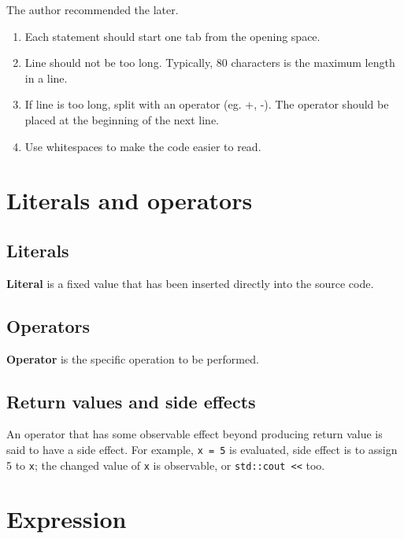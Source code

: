 \documentclass[
  letterpaper,
  DIV=11,
  numbers=noendperiod]{scrreprt}
\providecommand{\tightlist}{%
  \setlength{\itemsep}{0pt}\setlength{\parskip}{0pt}}\usepackage{longtable,booktabs,array}
\begin{document}
The author recommended the later.

\begin{enumerate}
\def\labelenumi{\arabic{enumi}.}
\setcounter{enumi}{2}
\tightlist
\item
  Each statement should start one tab from the opening space.
\item
  Line should not be too long. Typically, 80 characters is the maximum
  length in a line.
\item
  If line is too long, split with an operator (eg. +, -). The operator
  should be placed at the beginning of the next line.
\item
  Use whitespaces to make the code easier to read.
\end{enumerate}

\hypertarget{literals-and-operators}{%
\section{Literals and operators}\label{literals-and-operators}}

\hypertarget{literals}{%
\subsection{Literals}\label{literals}}

\textbf{Literal} is a fixed value that has been inserted directly into
the source code.

\hypertarget{operators}{%
\subsection{Operators}\label{operators}}

\textbf{Operator} is the specific operation to be performed.

\hypertarget{return-values-and-side-effects}{%
\subsection{Return values and side
effects}\label{return-values-and-side-effects}}

An operator that has some observable effect beyond producing return
value is said to have a side effect. For example, \texttt{x\ =\ 5} is
evaluated, side effect is to assign 5 to \texttt{x}; the changed value
of \texttt{x} is observable, or
\texttt{std::cout\ \textless{}\textless{}} too.

\hypertarget{expression}{%
\section{Expression}\label{expression}}
\end{document}
